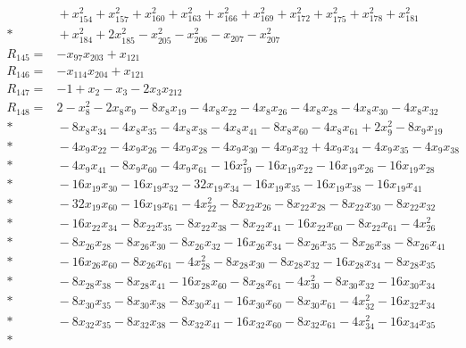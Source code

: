 \documentclass[11pt]{article}
\theoremstyle{remark}\newtheorem{remark}[theorem]{Remark}
\begin{document}
\begin{align*}
&{} + x_{154}^{2} + x_{157}^{2} + x_{160}^{2} + x_{163}^{2} + x_{166}^{2} + x_{169}^{2} + x_{172}^{2} + x_{175}^{2} + x_{178}^{2} + x_{181}^{2} \\*
&{} + x_{184}^{2} + 2x_{185}^{2} - x_{205}^{2} - x_{206}^{2} - x_{207} - x_{207}^{2} \\[4pt]
R_{145} ={}& -x_{97}x_{203} + x_{121} \\[4pt]
R_{146} ={}& -x_{114}x_{204} + x_{121} \\[4pt]
R_{147} ={}& -1 + x_{2} - x_{3} - 2x_{3}x_{212} \\[4pt]
R_{148} ={}& 2 - x_{8}^{2} - 2x_{8}x_{9} - 8x_{8}x_{19} - 4x_{8}x_{22} - 4x_{8}x_{26} - 4x_{8}x_{28} - 4x_{8}x_{30} - 4x_{8}x_{32} \\*
&{} - 8x_{8}x_{34} - 4x_{8}x_{35} - 4x_{8}x_{38} - 4x_{8}x_{41} - 8x_{8}x_{60} - 4x_{8}x_{61} + 2x_{9}^{2} - 8x_{9}x_{19} \\*
&{} - 4x_{9}x_{22} - 4x_{9}x_{26} - 4x_{9}x_{28} - 4x_{9}x_{30} - 4x_{9}x_{32} + 4x_{9}x_{34} - 4x_{9}x_{35} - 4x_{9}x_{38} \\*
&{} - 4x_{9}x_{41} - 8x_{9}x_{60} - 4x_{9}x_{61} - 16x_{19}^{2} - 16x_{19}x_{22} - 16x_{19}x_{26} - 16x_{19}x_{28} \\*
&{} - 16x_{19}x_{30} - 16x_{19}x_{32} - 32x_{19}x_{34} - 16x_{19}x_{35} - 16x_{19}x_{38} - 16x_{19}x_{41} \\*
&{} - 32x_{19}x_{60} - 16x_{19}x_{61} - 4x_{22}^{2} - 8x_{22}x_{26} - 8x_{22}x_{28} - 8x_{22}x_{30} - 8x_{22}x_{32} \\*
&{} - 16x_{22}x_{34} - 8x_{22}x_{35} - 8x_{22}x_{38} - 8x_{22}x_{41} - 16x_{22}x_{60} - 8x_{22}x_{61} - 4x_{26}^{2} \\*
&{} - 8x_{26}x_{28} - 8x_{26}x_{30} - 8x_{26}x_{32} - 16x_{26}x_{34} - 8x_{26}x_{35} - 8x_{26}x_{38} - 8x_{26}x_{41} \\*
&{} - 16x_{26}x_{60} - 8x_{26}x_{61} - 4x_{28}^{2} - 8x_{28}x_{30} - 8x_{28}x_{32} - 16x_{28}x_{34} - 8x_{28}x_{35} \\*
&{} - 8x_{28}x_{38} - 8x_{28}x_{41} - 16x_{28}x_{60} - 8x_{28}x_{61} - 4x_{30}^{2} - 8x_{30}x_{32} - 16x_{30}x_{34} \\*
&{} - 8x_{30}x_{35} - 8x_{30}x_{38} - 8x_{30}x_{41} - 16x_{30}x_{60} - 8x_{30}x_{61} - 4x_{32}^{2} - 16x_{32}x_{34} \\*
&{} - 8x_{32}x_{35} - 8x_{32}x_{38} - 8x_{32}x_{41} - 16x_{32}x_{60} - 8x_{32}x_{61} - 4x_{34}^{2} - 16x_{34}x_{35} \\*

\end{align*}
\end{document}
